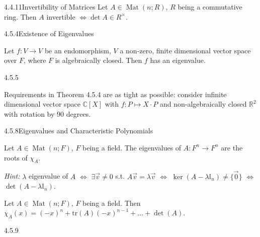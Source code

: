 \documentclass[10pt]{article} %
\DeclareMathOperator{\Mat}{Mat}
\newcommand{\Hint}{\vspace{0.2em}\textit{Hint: }}
\begin{document}
\begin{multicols}{3}
\begin{corollary}{4.4.11}{Invertibility of Matrices}
    Let $A \in \Mat(n;R)$, $R$ being a commutative ring. Then $A$ invertible $\Leftrightarrow \det{A} \in R^{\times}$.

\end{corollary}

\begin{theorem}{4.5.4}{Existence of Eigenvalues}

    Let $f: V \to V$ be an endomorphism, $V$ a non-zero, finite dimensional vector space over $F$, where $F$ is algebraically closed. Then $f$ has an eigenvalue.

\end{theorem}

\begin{remark}{4.5.5}{}

    Requirements in Theorem 4.5.4 are as tight as possible: consider infinite dimensional vector space $\mathbb{C}[X]$ with $f: P \mapsto X \cdot P$ and non-algebraically closed $\mathbb{R}^2$ with rotation by $90$ degrees.

\end{remark}

\begin{theorem}{4.5.8}{Eigenvalues and Characteristic Polynomials}

    Let $A \in \Mat(n;F)$, $F$ being a field. The eigenvalues of $A: F^n \to F^n$ are the roots of $\chi_A$.

    \Hint $\lambda$ eigenvalue of $A$ $\Leftrightarrow$ $\exists \vec{v} \neq 0$ s.t. $A\vec{v} = \lambda \vec{v}$ $\Leftrightarrow$ $\ker(A - \lambda \mathbb{I}_n) \neq \{\vec{0}\}$ $\Leftrightarrow$ $\det(A - \lambda \mathbb{I}_n)$.

\end{theorem}

\begin{exercise}{67}{}

    Let $A \in \Mat(n;F)$, $F$ being a field. Then $\chi_A(x) = (-x)^n + \mathrm{tr}(A)(-x)^{n-1} + \hdots + \det{(A)}$.

\end{exercise}

\begin{remark}{4.5.9}{}


\end{remark}
\end{multicols}
\end{document}
